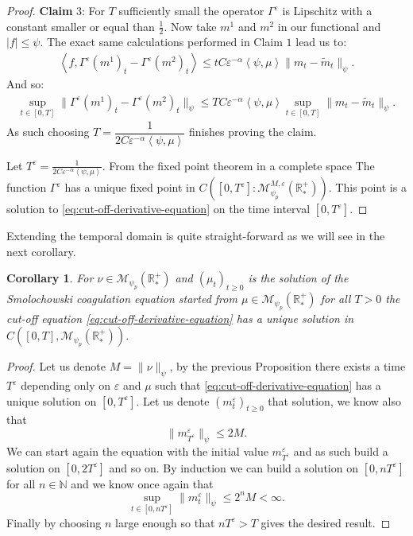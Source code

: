 \documentclass[11pt,a4paper]{article}
\newcommand{\NN}{\mathbb{N}}
\newcommand{\RRP}{\mathbb{R}^+_*}
\newcommand{\MC}{\mathcal{M}}
\newcommand{\Proc}[1]{\left(#1\right)_{t\geq 0}}
\newcommand{\brac}[1]{\left\langle#1\right\rangle}
\newtheorem{corollary}[theorem]{Corollary}
\begin{document}
\begin{proof}
    \textbf{Claim} 3: For $T$ sufficiently small the operator $\Gamma^\varepsilon$ is Lipschitz with a constant smaller or equal than $\frac12$. Now take $m^1$ and $m^2$ in our functional and $|f| \leq \psi$. The exact same calculations performed in Claim $1$ lead us to:
    \begin{align*}
        \brac{f, \Gamma^\varepsilon(m^1)_t - \Gamma^\varepsilon(m^2)_t}  \leq tC\varepsilon^{-\alpha}\brac{\psi,\mu} \| m_t - \tilde{m}_t\|_{\psi}.
    \end{align*}
    And so:
    \begin{align*}
        \sup\limits_{t \in [0,T]} \| \Gamma^\varepsilon(m^1)_t - \Gamma^\varepsilon(m^2)_t\|_{\psi}
        \leq TC\varepsilon^{-\alpha}\brac{\psi,\mu}\sup\limits_{t \in [0,T]} \| m_t - \tilde{m}_t\|_{\psi}.
    \end{align*}
    As such choosing $T = \dfrac{1}{2C\varepsilon^{-\alpha}\brac{\psi,\mu}}$ finishes proving the claim.

    Let $T^\varepsilon = \frac{1}{2C\varepsilon^{-\alpha}\brac{\psi,\mu}}$. From the fixed point theorem in a complete space The function $\Gamma^\varepsilon$ has a unique fixed point in \(C\left([0,T^\varepsilon]:\MC^{M,\varepsilon}_{\psi_p}\left(\RRP\right) \right) \). This point is a solution to \eqref{eq:cut-off-derivative-equation} on the time interval $[0,T^\varepsilon]$.
\end{proof}
Extending the temporal domain is quite straight-forward as we will see in the next corollary.
\begin{corollary}\label{cor:well-posedness-derivative-unbounded-space}
    For $\nu \in \MC_{\psi_p}(\RRP)$ and $\Proc{\mu_t}$ is the solution of the Smolochowski coagulation equation started from $\mu \in \MC_{\psi_p}(\RRP)$ for all $T > 0$ the cut-off equation \eqref{eq:cut-off-derivative-equation} has a unique solution in $C\left([0,T],\MC_{\psi_p}(\RRP)\right)$. 
\end{corollary}
\begin{proof}
    Let us denote \(M = \|\nu \|_{\psi}\), by the previous Proposition there exists a time $T^\varepsilon$ depending only on $\varepsilon$ and $\mu$ such that \eqref{eq:cut-off-derivative-equation} has a unique solution on \( [0,T^\varepsilon]\). Let us denote $\Proc{m^\varepsilon_t}$ that solution, we know also that 
    \[\|m^\varepsilon_{T^\varepsilon} \|_{\psi} \leq 2M.\]
    We can start again the equation with the initial value \(m^\varepsilon_{T^\varepsilon}\) and as such build a solution on \( [0,2T^\varepsilon]\) and so on. By induction we can build a solution on \( [0,nT^\varepsilon]\) for all $n \in \NN$ and we know once again that
    \[ \sup\limits_{t \in [0,n T^\varepsilon]}\|m^\varepsilon_{t} \|_{\psi} \leq 2^n M < \infty .\]
    Finally by choosing $n$ large enough so that \( n T^\varepsilon > T\) gives the desired result.
\end{proof}
\end{document}
